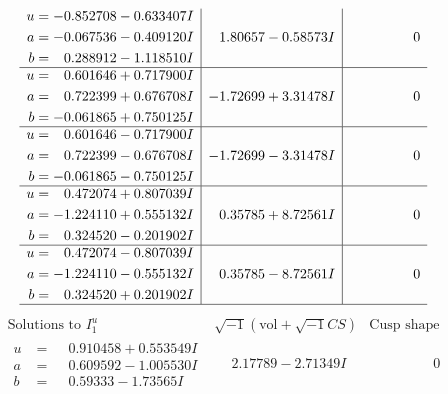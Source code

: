 \documentclass[1p]{elsarticle_modified}
\theoremstyle{definition}
\newcommand{\I}{\sqrt{-1}}
\begin{document}
$$\begin{array}{c|c|c}
\begin{aligned}
u &= -0.852708 - 0.633407 I \\
a &= -0.067536 - 0.409120 I \\
b &= \phantom{-}0.288912 - 1.118510 I\end{aligned}
 & \phantom{-}1.80657 - 0.58573 I & \phantom{-0.000000 } 0 \\ \hline\begin{aligned}
u &= \phantom{-}0.601646 + 0.717900 I \\
a &= \phantom{-}0.722399 + 0.676708 I \\
b &= -0.061865 + 0.750125 I\end{aligned}
 & -1.72699 + 3.31478 I & \phantom{-0.000000 } 0 \\ \hline\begin{aligned}
u &= \phantom{-}0.601646 - 0.717900 I \\
a &= \phantom{-}0.722399 - 0.676708 I \\
b &= -0.061865 - 0.750125 I\end{aligned}
 & -1.72699 - 3.31478 I & \phantom{-0.000000 } 0 \\ \hline\begin{aligned}
u &= \phantom{-}0.472074 + 0.807039 I \\
a &= -1.224110 + 0.555132 I \\
b &= \phantom{-}0.324520 - 0.201902 I\end{aligned}
 & \phantom{-}0.35785 + 8.72561 I & \phantom{-0.000000 } 0 \\ \hline\begin{aligned}
u &= \phantom{-}0.472074 - 0.807039 I \\
a &= -1.224110 - 0.555132 I \\
b &= \phantom{-}0.324520 + 0.201902 I\end{aligned}
 & \phantom{-}0.35785 - 8.72561 I & \phantom{-0.000000 } 0\\
 \hline 
 \end{array}$$\newpage$$\begin{array}{c|c|c}  
\text{Solutions to }I^u_{1}& \I (\text{vol} + \sqrt{-1}CS) & \text{Cusp shape}\\
 \hline 
\begin{aligned}
u &= \phantom{-}0.910458 + 0.553549 I \\
a &= \phantom{-}0.609592 - 1.005530 I \\
b &= \phantom{-}0.59333 - 1.73565 I\end{aligned}
 & \phantom{-}2.17789 - 2.71349 I & \phantom{-0.000000 } 0 \\ \hline\begin{aligned}

\end{aligned}
\end{array}$$
\end{document}
